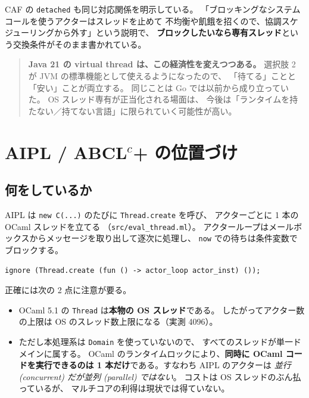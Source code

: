 \documentclass[11pt,a4paper]{ltjsarticle}
\begin{document}
CAF の \texttt{detached} も同じ対応関係を明示している。
「ブロッキングなシステムコールを使うアクターはスレッドを止めて
不均衡や飢餓を招くので、協調スケジューリングから外す」という説明で、
\textbf{ブロックしたいなら専有スレッド}という交換条件がそのまま書かれている。

\begin{quote}\small
\textbf{Java 21 の virtual thread は、この経済性を変えつつある。}
選択肢 2 が JVM の標準機能として使えるようになったので、
「待てる」ことと「安い」ことが両立する。
同じことは Go では以前から成り立っていた。
OS スレッド専有が正当化される場面は、
今後は「ランタイムを持たない／持てない言語」に限られていく可能性が高い。
\end{quote}

\section{AIPL / ABCL$^{c}$+ の位置づけ}
\label{sec:aipl}

\subsection{何をしているか}

AIPL は \texttt{new C(...)} のたびに \texttt{Thread.create} を呼び、
アクターごとに 1 本の OCaml スレッドを立てる
（\texttt{src/eval\_thread.ml}）。
アクターループはメールボックスからメッセージを取り出して逐次に処理し、
\texttt{now} での待ちは条件変数でブロックする。

\begin{lstlisting}[language={}]
ignore (Thread.create (fun () -> actor_loop actor_inst) ());
\end{lstlisting}

正確には次の 2 点に注意が要る。

\begin{itemize}
\item OCaml 5.1 の \texttt{Thread} は\textbf{本物の OS スレッド}である。
  したがってアクター数の上限は OS のスレッド数上限になる（実測 4096）。
\item ただし本処理系は \texttt{Domain} を使っていないので、
  すべてのスレッドが単一ドメインに属する。
  OCaml のランタイムロックにより、\textbf{同時に OCaml コードを実行できるのは
  1 本だけ}である。すなわち AIPL のアクターは
  \emph{並行 (concurrent) だが並列 (parallel) ではない}。
  コストは OS スレッドのぶん払っているが、
  マルチコアの利得は現状では得ていない。
\end{itemize}
\end{document}
